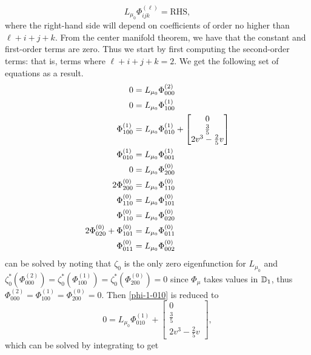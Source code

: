 \begin{equation*}
	L_{\mu_0} \Phi^{(\ell)}_{ijk} = \mathrm{RHS},
\end{equation*}
where the right-hand side will depend on coefficients of order no higher than \(\ell + i + j + k\). From the center manifold theorem, we have that the constant and first-order terms are zero. Thus we start by first computing the second-order terms: that is, terms where \(\ell + i + j + k = 2\). We get the following set of equations as a result.
\begin{align}
	0 &= L_{\mu_0} \Phi^{(2)}_{000} \label{phi-2-000} \\ 
	0 & = L_{\mu_0} \Phi^{(1)}_{100} \label{phi-1-100} \\
	\Phi^{(1)}_{100}  & = L_{\mu_0} \Phi^{(1)}_{010} + \begin{bmatrix} 0 \\ \frac 35 \\ 2v^3 - \frac 2 5 v \end{bmatrix} \label{phi-1-010} \\
	\Phi^{(1)}_{010}  & = L_{\mu_0} \Phi^{(1)}_{001} \label{phi-1-001} \\
	0 & = L_{\mu_0} \Phi^{(0)}_{200} \label{phi-0-200}\\
	2\Phi^{(0)}_{200}  & = L_{\mu_0} \Phi^{(0)}_{110} \notag \\ 
		\Phi^{(0)}_{110}  & = L_{\mu_0} \Phi^{(0)}_{101} \notag \\
	\Phi^{(0)}_{110}  & = L_{\mu_0} \Phi^{(0)}_{020} \\
	2\Phi^{(0)}_{020}  + \Phi^{(0)}_{101} & = L_{\mu_0} \Phi^{(0)}_{011} \notag \\
	\Phi^{(0)}_{011}  & = L_{\mu_0} \Phi^{(0)}_{002}  \notag
\end{align}
 can be solved by noting that \(\zeta_0\) is the only zero eigenfunction for \(L_{\mu_0}\) and \(\zeta_0^*(\Phi_{000}^{(2) }) = \zeta_0^*(\Phi_{100}^{(1)}) = \zeta_0^*(\Phi_{200}^{(0)}) = 0\) since \(\Phi_\mu\) takes values in \(\mathbb{D}_1\), thus \(\Phi_{000}^{(2)} = \Phi_{100}^{(1)} =\Phi_{200}^{(0)} = 0\). Then \cref{phi-1-010} is reduced to 
\begin{equation*}
	0 =  L_{\mu_0} \Phi^{(1)}_{010} + \begin{bmatrix} 0 \\ \frac 35 \\ 2v^3 - \frac 2 5 v \end{bmatrix},
\end{equation*}
which can be solved by integrating to get 
